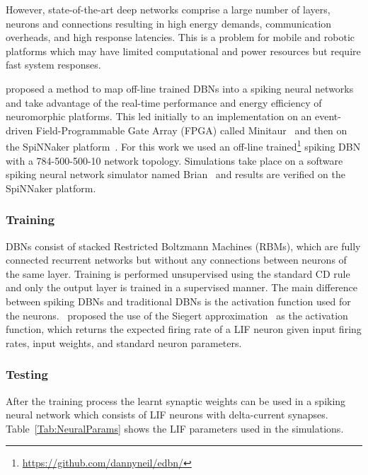 However, state-of-the-art deep networks comprise a large number of layers, neurons and connections resulting in high energy demands, communication overheads, and high response latencies. This is a problem for mobile and robotic platforms which may have limited computational and power resources but require fast system responses. 


\citet{o2013real} proposed a method to map off-line trained DBNs into a spiking neural networks and take advantage of the real-time performance and energy efficiency of neuromorphic platforms. This led initially to an implementation on an event-driven Field-Programmable Gate Array (FPGA) called Minitaur~\citep{neil2014minitaur} and then on the SpiNNaker platform~\citep{Stromatias2015scalable}. For this work we used an off-line trained\footnote{\url{https://github.com/dannyneil/edbn/}} spiking DBN with a 784-500-500-10 network topology. Simulations take place on a software spiking neural network simulator named Brian~\citep{goodman2008brian} and results are verified on the SpiNNaker platform.

\subsubsection{Training}

DBNs consist of stacked Restricted Boltzmann Machines (RBMs), which are fully connected recurrent networks but without any connections between neurons of the same layer. Training is performed unsupervised using the standard CD rule~\citep{hinton2006fast} and only the output layer is trained in a supervised manner. The main difference between spiking DBNs and traditional DBNs is the activation function used for the neurons.~\cite{o2013real} proposed the use of the Siegert approximation~\citep{Jug_etal_2012} as the activation function, which returns the expected firing rate of a LIF neuron given input firing rates, input weights, and standard neuron parameters.

\subsubsection{Testing}
After the training process the learnt synaptic weights can be used in a spiking neural network which consists of LIF neurons with delta-current synapses. Table~\ref{Tab:NeuralParams} shows the LIF parameters used in the simulations.

